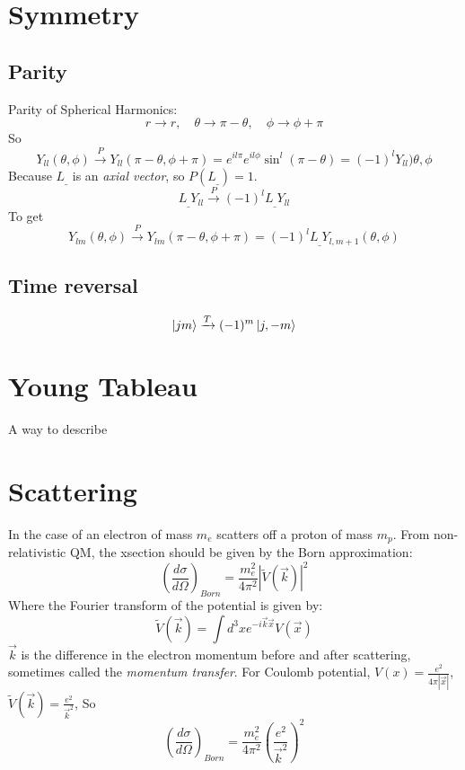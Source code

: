 \section{Symmetry}

\subsection{Parity} 
Parity of Spherical Harmonics:
\[
    r\rightarrow{}r,\quad\theta\rightarrow\pi-\theta,\quad\phi\rightarrow\phi+\pi
    \]
So
\[
    Y_{ll}(\theta,\phi)\xrightarrow{P}Y_{ll}(\pi-\theta,\phi+\pi)=e^{il\pi}e^{il\phi}\sin^l(\pi-\theta)=(-1)^{l}Y_{ll})\theta,\phi
    \]
Because $L_\_$ is an \emph{axial vector}, so $P(L_\_)=1$.
\[
    L_\_Y_{ll}\xrightarrow{P}(-1)^{l}L_\_Y_{ll}
    \]
To get
\[
    Y_{lm}(\theta,\phi)\xrightarrow{P}Y_{lm}(\pi-\theta,\phi+\pi)=(-1)^{l}L_\_Y_{l,m+1}(\theta,\phi)
    \]

\subsection{Time reversal}
\[
    \ket{jm}\xrightarrow{T}(-1)^m\ket{j,-m}
    \]


\section{Young Tableau}
A way to describe 

\section{Scattering}
In the case of an electron of mass $m_e$ scatters off a proton of mass $m_p$. 
From non-relativistic QM, the xsection should be given by the Born approximation:
\begin{equation}
    \left(\frac{d\sigma}{d\Omega}\right)_{Born} = \frac{m_e^2}{4\pi^2}|\tilde{V}(\vec{k})|^2
\end{equation}
Where the Fourier transform of the potential is given by:
\[
    \tilde{V}(\vec{k}) = \int d^3xe^{-i\vec{k}\vec{x}}V(\vec{x})
    \]
$\vec{k}$ is the difference in the electron momentum before and after scattering, 
sometimes called the \emph{momentum transfer}. For Coulomb potential, 
$V(x) = \frac{e^2}{4\pi|\vec{x}|}$, $\tilde{V}(\vec{k}) = \frac{e^2}{\vec{k}^2}$, 
So
\[
    \left(\frac{d\sigma}{d\Omega}\right)_{Born} = \frac{m_e^2}{4\pi^2}\left(\frac{e^2}{\vec{k}^2}\right)^2
    \]

